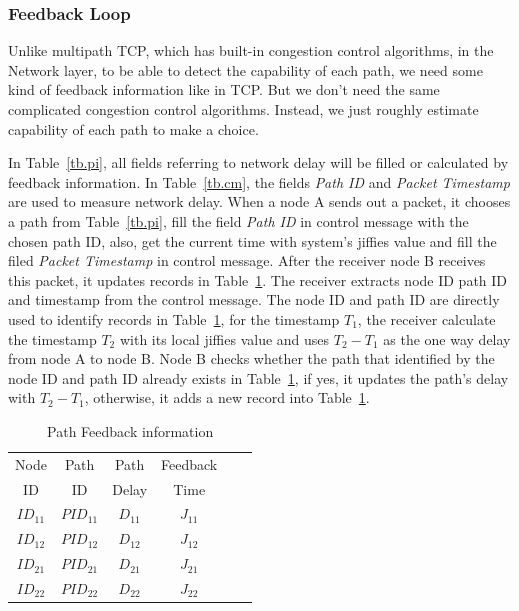 \subsubsection{Feedback Loop}

Unlike multipath TCP, which has built-in congestion control algorithms, in the Network layer, to be able to detect the capability of each path, we need some kind of feedback information like in TCP. But we don\textquoteright t need the same complicated congestion control algorithms. Instead, we just roughly estimate capability of each path to make a choice.

In Table~\ref{tb.pi}, all fields referring to network delay will be filled or calculated by feedback information. In Table~\ref{tb.cm}, the fields \emph{Path ID} and \emph{Packet Timestamp} are used to measure network delay. When a node A sends out a packet, it chooses a path from Table~\ref{tb.pi}, fill the field \emph{Path ID} in control message with the chosen path ID, also, get the current time with system\textquoteright s jiffies value and fill the filed \emph{Packet Timestamp} in control message. After the receiver node B receives this packet, it updates records in Table~\ref{tb.ps}. The receiver extracts node ID path ID and timestamp from the control message. The node ID and path ID are directly used to identify records in Table~\ref{tb.ps}, for the timestamp $T_1$, the receiver calculate the timestamp $T_2$ with its local jiffies value and uses $T_2-T_1$ as the one way delay from node A to node B. Node B checks whether the path that identified by the node ID and path ID already exists in Table~\ref{tb.ps}, if yes, it updates the path\textquoteright s delay with $T_2-T_1$, otherwise, it adds a new record into Table~\ref{tb.ps}.

\begin{table}[htbp]
\caption{\label{tb.ps}Path Feedback information}
\centering
\begin{tabular}{|c|c|c|c|c|c|}
\hline
 Node   & Path    & Path      & Feedback           \\
  ID    &  ID     & Delay     & Time               \\
\hline
${ID}_{11}$&${PID}_{11}$&${D}_{11}$&${J}_{11}$   \\
\hline
${ID}_{12}$&${PID}_{12}$&${D}_{12}$&${J}_{12}$   \\
\hline
${ID}_{21}$&${PID}_{21}$&${D}_{21}$&${J}_{21}$   \\
\hline
${ID}_{22}$&${PID}_{22}$&${D}_{22}$&${J}_{22}$   \\
\hline
\end{tabular}
\end{table}

